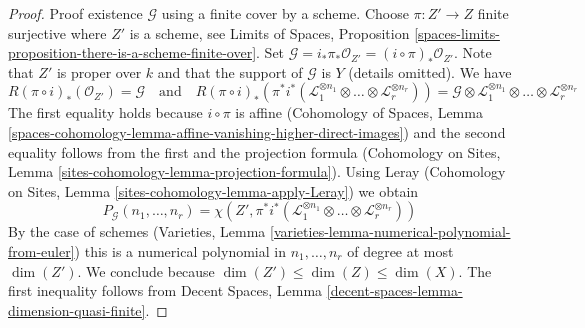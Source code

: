 \documentclass{stacks-project}
\theoremstyle{plain}
\theoremstyle{definition}
\theoremstyle{remark}
\numberwithin{equation}{subsection}
\begin{document}
\begin{proof}
\medskip\noindent
Proof existence $\mathcal{G}$ using a finite cover by a scheme.
Choose $\pi : Z' \to Z$ finite surjective where $Z'$ is a scheme, see
Limits of Spaces, Proposition
\ref{spaces-limits-proposition-there-is-a-scheme-finite-over}.
Set $\mathcal{G} = i_*\pi_*\mathcal{O}_{Z'} = (i \circ \pi)_*\mathcal{O}_{Z'}$.
Note that $Z'$ is proper over $k$ and that the support of $\mathcal{G}$ is $Y$
(details omitted). We have
$$
R(\pi \circ i)_*(\mathcal{O}_{Z'}) = \mathcal{G}
\quad\text{and}\quad
R(\pi \circ i)_*(\pi^*i^*(\mathcal{L}_1^{\otimes n_1} \otimes \ldots \otimes
\mathcal{L}_r^{\otimes n_r})
) = \mathcal{G} \otimes \mathcal{L}_1^{\otimes n_1} \otimes \ldots \otimes
\mathcal{L}_r^{\otimes n_r}
$$
The first equality holds because $i \circ \pi$ is affine
(Cohomology of Spaces, Lemma
\ref{spaces-cohomology-lemma-affine-vanishing-higher-direct-images})
and the second equality follows from the first and the projection formula
(Cohomology on Sites, Lemma \ref{sites-cohomology-lemma-projection-formula}).
Using Leray
(Cohomology on Sites, Lemma \ref{sites-cohomology-lemma-apply-Leray})
we obtain
$$
P_\mathcal{G}(n_1, \ldots, n_r) =
\chi(Z', \pi^*i^*(\mathcal{L}_1^{\otimes n_1} \otimes \ldots \otimes
\mathcal{L}_r^{\otimes n_r}))
$$
By the case of schemes
(Varieties, Lemma \ref{varieties-lemma-numerical-polynomial-from-euler})
this is a numerical polynomial in
$n_1, \ldots, n_r$ of degree at most $\dim(Z')$.
We conclude because $\dim(Z') \leq \dim(Z) \leq \dim(X)$.
The first inequality follows from
Decent Spaces, Lemma \ref{decent-spaces-lemma-dimension-quasi-finite}.


\end{proof}
\end{document}
